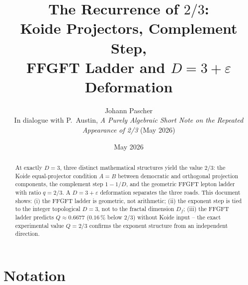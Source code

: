 
\title{The Recurrence of \(2/3\):\\[0.4em]
\large Koide Projectors, Complement Step,\\
FFGFT Ladder and \(D = 3+\varepsilon\) Deformation}
\author{Johann Pascher\\[0.3em]
\small In dialogue with P.~Austin,
\textit{A Purely Algebraic Short Note on the Repeated Appearance of 2/3}
(May 2026)}
\date{May 2026}
\maketitle

\begin{abstract}
At exactly \(D = 3\), three distinct mathematical structures yield the
value \(2/3\): the Koide equal-projector condition \(A = B\) between
democratic and orthogonal projection components,
the complement step \(1 - 1/D\),
and the geometric FFGFT lepton ladder with ratio \(q = 2/3\).
A \(D = 3+\varepsilon\) deformation separates the three roads.
This document shows:
(i) the FFGFT ladder is geometric, not arithmetic;
(ii) the exponent step is tied to the integer topological \(D=3\),
not to the fractal dimension \(D_f\);
(iii) the FFGFT ladder predicts \(Q \approx 0.6677\)
(\(0.16\,\%\) below \(2/3\)) without Koide input --
the exact experimental value \(Q = 2/3\) confirms the exponent structure
from an independent direction.
\end{abstract}

\tableofcontents

\section*{Notation}

